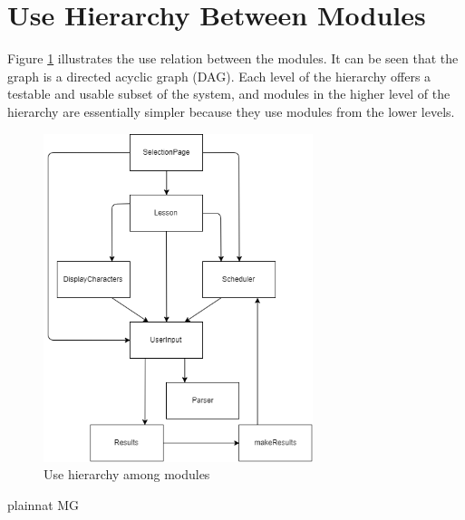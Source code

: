 \documentclass[12pt, titlepage]{article}
\begin{document}
\section{Use Hierarchy Between Modules} \label{SecUse}

Figure \ref{FigUH} illustrates the use relation between
the modules. It can be seen that the graph is a directed acyclic graph
(DAG). Each level of the hierarchy offers a testable and usable subset of the
system, and modules in the higher level of the hierarchy are essentially simpler
because they use modules from the lower levels.

\begin{figure}[H]
\centering
\includegraphics[width=0.7\textwidth]{UsesHierarchy.png}
\caption{Use hierarchy among modules}
\label{FigUH}
\end{figure}


 {plainnat}
 {MG}
\end{document}

